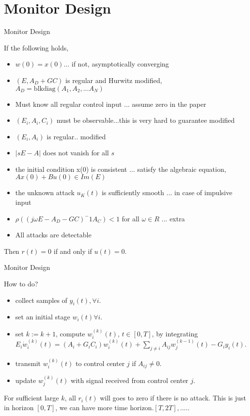 \documentclass{beamer}
\begin{document}
\section{Monitor Design}
\begin{frame}{Monitor Design}

If the following holds, 
\begin{itemize}
\item $w(0)=x(0)$... {\color{red} if not, asymptotically converging}
\item $(E, A_D+GC)$ is regular and Hurwitz {\color{blue} modified, $A_D=\text{blkdiag}(A_1, A_2, ...A_N)$}
\item Must know all regular control input ...{\color{red} assume zero in the paper}
\item $(E_i,A_i,C_i)$ must be observable...{\color{red}this is very hard to guarantee} {\color{blue} modified}
\item $(E_i,A_i)$ is regular.. {\color{blue} modified}
\item $|sE-A|$ does not vanish for all $s$
\item the initial condition x(0) is consistent ... {\color{red}satisfy the algebraic equation, $Ax(0)+Bu(0)\in Im(E)$}
\item the unknown attack $u_K(t)$ is sufficiently smooth ... {\color{red} in case of impulsive input}
\item $\rho((j\omega E-A_D-GC)^-1A_C)<1$ for all $\omega \in R$ ... {\color{blue} extra}
\item All attacks are detectable
\end{itemize}
Then $r(t) = 0$ if and only if $u(t) = 0 $.
\end{frame}

\begin{frame}{Monitor Design}

How to do?%
\begin{itemize}
\item collect samples of $y_i(t), \forall i$.
\item set an initial stage $w_i(t) \forall i$.
\item set $k:=k+1$, compute $w_i^{(k)}(t)$, $t\in[0,T]$, by integrating\\
$E_i \dot{w}_i^{(k)}(t) = (A_i+G_iC_i)w_i^{(k)}(t) + \sum_{j\neq i}A_{ij}w_j^{(k-1)}(t)- G_iy_i(t)$.
\item transmit $w_i^{(k)}(t)$ to control center $j$ if $A_{ij}\neq 0$.
\item update $w_j^{(k)}(t)$ with signal received from control center $j$.
\end{itemize}
For sufficient large $k$, all $r_i(t)$ will goes to zero if there is no attack.
This is just in horizon $[0,T]$, we can have more time horizon.$[T,2T],....$.
\end{frame}
\end{document}
